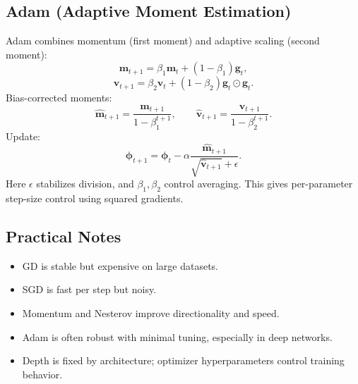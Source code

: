 \subsection{Adam (Adaptive Moment Estimation)}
Adam combines momentum (first moment) and adaptive scaling (second moment):
\[
\mathbf{m}_{t+1}=\beta_1\mathbf{m}_t+(1-\beta_1)\mathbf{g}_t,
\]
\[
\mathbf{v}_{t+1}=\beta_2\mathbf{v}_t+(1-\beta_2)\mathbf{g}_t\odot\mathbf{g}_t.
\]
Bias-corrected moments:
\[
\hat{\mathbf{m}}_{t+1}=\frac{\mathbf{m}_{t+1}}{1-\beta_1^{t+1}},
\qquad
\hat{\mathbf{v}}_{t+1}=\frac{\mathbf{v}_{t+1}}{1-\beta_2^{t+1}}.
\]
Update:
\[
\boldsymbol{\phi}_{t+1}
=
\boldsymbol{\phi}_t
-\alpha\frac{\hat{\mathbf{m}}_{t+1}}{\sqrt{\hat{\mathbf{v}}_{t+1}}+\epsilon}.
\]
Here $\epsilon$ stabilizes division, and $\beta_1,\beta_2$ control averaging.
This gives per-parameter step-size control using squared gradients.

\subsection{Practical Notes}
\begin{itemize}
    \item GD is stable but expensive on large datasets.
    \item SGD is fast per step but noisy.
    \item Momentum and Nesterov improve directionality and speed.
    \item Adam is often robust with minimal tuning, especially in deep networks.
    \item Depth is fixed by architecture; optimizer hyperparameters control training behavior.
\end{itemize}
